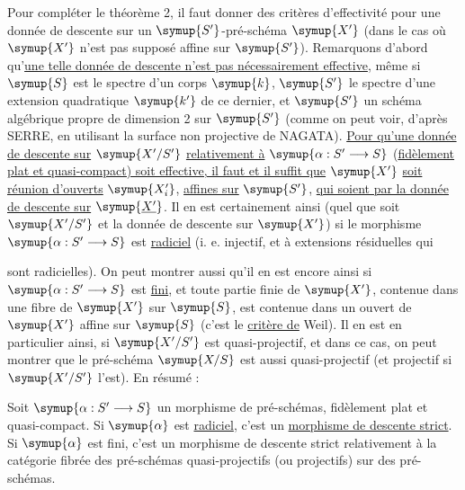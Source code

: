 Pour compléter le théorème 2, il faut donner des critères d'effectivité pour
une donnée de descente sur un $\symup{S'}$-pré-schéma $\symup{X'}$ (dans le cas où $\symup{X'}$ n'est
pas supposé affine sur $\symup{S'}$). Remarquons d'abord qu'\uline{une telle donnée de descente n'est pas nécessairement effective}, même si $\symup{S}$ est le spectre d'un
corps $\symup{k}$, $\symup{S'}$ le spectre d'une extension quadratique $\symup{k'}$ de ce dernier, et
$\symup{S'}$ un schéma algébrique propre de dimension 2 sur $\symup{S'}$ (comme on peut voir,
d'après SERRE, en utilisant la surface non projective de NAGATA). \uline{Pour qu'une donnée de descente sur} $\symup{X'/S'}$ \uline{relativement à} $\symup{\alpha:S'\longrightarrow S}$ (\uline{fidèlement plat et quasi-compact) soit effective, il faut et il suffit que} $\symup{X'}$ \uline{soit réunion d'ouverts} $\symup{X'_i}$, \uline{affines sur} $\symup{S'}$, \uline{qui soient  par la donnée de descente sur} $\symup{\underline{X'}}$. Il en est
certainement ainsi (quel que soit $\symup{X'/S'}$ et la donnée de descente sur $\symup{X'}$)
si le morphisme $\symup{\alpha:S'\longrightarrow S}$ est \uline{radiciel} (i. e.
injectif, et à extensions résiduelles qui

sont radicielles). On peut montrer aussi qu'il en est encore ainsi si
$\symup{\alpha:S'\longrightarrow S}$ est \uline{fini}, et toute partie finie de $\symup{X'}$,
contenue dans une fibre de $\symup{X'}$ sur $\symup{S}$, est contenue dans un ouvert de $\symup{X'}$
affine sur $\symup{S}$ (c'est le \uline{critère de} Weil). Il en est en particulier
ainsi, si $\symup{X'/S'}$ est quasi-projectif, et dans ce cas, on peut montrer que le
pré-schéma  $\symup{X/S}$ est aussi quasi-projectif (et projectif si $\symup{X'/S'}$
l'est). En résumé :

 Soit $\symup{\alpha:S'\longrightarrow S}$ un morphisme de
pré-schémas, fidèlement plat et quasi-compact. Si $\symup{\alpha}$ est \uline{radiciel},
c'est un \uline{morphisme de descente strict}. Si $\symup{\alpha}$ est fini, c'est un
morphisme de descente strict relativement à la catégorie fibrée des pré-schémas
quasi-projectifs (ou projectifs) sur des pré-schémas.

